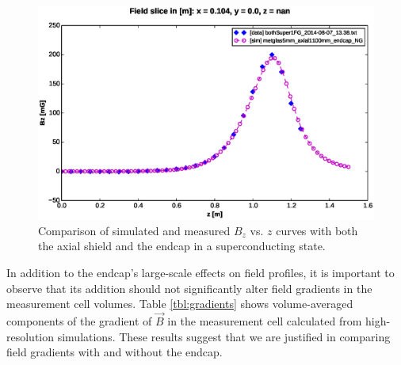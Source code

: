 \documentclass[twocolumn,aps,prb,citeautoscript]{revtex4-1}
\begin{document}
\begin{figure}
    \includegraphics[width=\textwidth]{figures/SCSC_comp.eps}
    \caption{\label{fig:SCSC_comp}Comparison of simulated and measured $B_z$ vs. $z$ curves with both the
    axial shield and the endcap in a superconducting state.}
\end{figure}

In addition to the endcap's large-scale effects on field profiles, it is important to observe that its addition
should not significantly alter field gradients in the measurement cell volumes. Table \ref{tbl:gradients} shows
volume-averaged components of the gradient of $\vec{B}$ in the measurement cell calculated from high-resolution
simulations. These results suggest that we are justified in comparing field gradients with and without the endcap.
\end{document}

